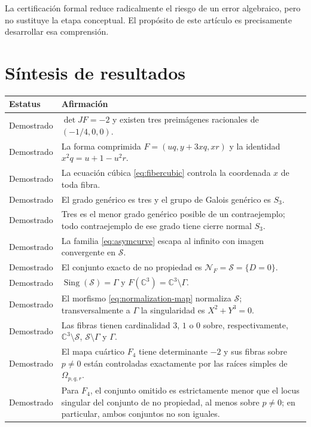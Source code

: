 \documentclass[11pt]{article}
\theoremstyle{definition}
\theoremstyle{remark}
\newcommand{\C}{\mathbb{C}}
\newcommand{\Sing}{\operatorname{Sing}}
\begin{document}
La certificaci\'on formal reduce radicalmente el riesgo de un error algebraico,
pero no sustituye la etapa conceptual. El prop\'osito de este art\'iculo es
precisamente desarrollar esa comprensi\'on.

\section{S\'intesis de resultados}

\begin{center}
\begin{tabular}{@{}p{}p{}@{}}
\toprule
Estatus & Afirmaci\'on \\
\midrule
Demostrado & $\det JF=-2$ y existen tres preim\'agenes racionales de
$(-1/4,0,0)$. \\
Demostrado & La forma comprimida $F=(uq,y+3xq,xr)$ y la identidad
$x^2q=u+1-u^2r$. \\
Demostrado & La ecuaci\'on c\'ubica \eqref{eq:fibercubic} controla la coordenada
$x$ de toda fibra. \\
Demostrado & El grado gen\'erico es tres y el grupo de Galois gen\'erico es
$S_3$. \\
Demostrado & Tres es el menor grado gen\'erico posible de un contraejemplo;
todo contraejemplo de ese grado tiene cierre normal $S_3$. \\
Demostrado & La familia \eqref{eq:asymcurve} escapa al infinito con imagen
convergente en $\mathcal S$. \\
Demostrado & El conjunto exacto de no propiedad es
$\mathcal N_F=\mathcal S=\{D=0\}$. \\
Demostrado & $\Sing(\mathcal S)=\Gamma$ y
$F(\C^3)=\C^3\setminus\Gamma$. \\
Demostrado & El morfismo \eqref{eq:normalization-map} normaliza $\mathcal S$;
transversalmente a $\Gamma$ la singularidad es $X^2+Y^3=0$. \\
Demostrado & Las fibras tienen cardinalidad $3$, $1$ o $0$ sobre,
respectivamente, $\C^3\setminus\mathcal S$,
$\mathcal S\setminus\Gamma$ y $\Gamma$. \\
Demostrado & El mapa cu\'artico $F_4$ tiene determinante $-2$ y sus fibras
sobre $p\neq0$ est\'an controladas exactamente por las ra\'ices simples de
$\Omega_{p,q,r}$. \\
Demostrado & Para $F_4$, el conjunto omitido es estrictamente menor que el
locus singular del conjunto de no propiedad, al menos sobre $p\neq0$; en
particular, ambos conjuntos no son iguales. \\

\end{tabular}
\end{center}
\end{document}
